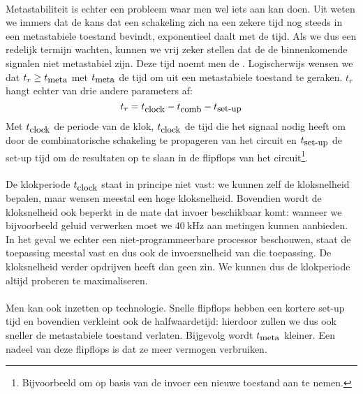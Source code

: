 \paragraph{}
Metastabiliteit is echter een probleem waar men wel iets aan kan doen. Uit  weten we immers dat de kans dat een schakeling zich na een zekere tijd nog steeds in een metastabiele toestand bevindt, exponentieel daalt met de tijd. Als we dus een redelijk termijn wachten, kunnen we vrij zeker stellen dat de de binnenkomende signalen niet metastabiel zijn. Deze tijd noemt men de . Logischerwijs wensen we dat $t_r\geq t_{\mbox{\small meta}}$ met $t_{\mbox{\small meta}}$ de tijd om uit een metastabiele toestand te geraken. $t_r$ hangt echter van drie andere parameters af:
\begin{equation}
t_r=t_{\mbox{\small clock}}-t_{\mbox{\small comb}}-t_{\mbox{\small set-up}}
\end{equation}
Met $t_{\mbox{\small clock}}$ de periode van de klok, $t_{\mbox{\small clock}}$ de tijd die het signaal nodig heeft om door de combinatorische schakeling te propageren van het circuit en $t_{\mbox{\small set-up}}$ de set-up tijd om de resultaten op te slaan in de flipflops van het circuit\footnote{Bijvoorbeeld om op basis van de invoer een nieuwe toestand aan te nemen.}.
\paragraph{}
De klokperiode $t_{\mbox{\small clock}}$ staat in principe niet vast: we kunnen zelf de kloksnelheid bepalen, maar wensen meestal een hoge kloksnelheid. Bovendien wordt de kloksnelheid ook beperkt in de mate dat invoer beschikbaar komt: wanneer we bijvoorbeeld geluid verwerken moet we $40~\mbox{kHz}$ aan metingen kunnen aanbieden. In het geval we echter een niet-programmeerbare processor beschouwen, staat de toepassing meestal vast en dus ook de invoersnelheid van die toepassing. De kloksnelheid verder opdrijven heeft dan geen zin. We kunnen dus de klokperiode altijd proberen te maximaliseren.
\paragraph{}
Men kan ook inzetten op technologie. Snelle flipflops hebben een kortere set-up tijd en bovendien verkleint ook de halfwaardetijd: hierdoor zullen we dus ook sneller de metastabiele toestand verlaten. Bijgevolg wordt $t_{\mbox{\small meta}}$ kleiner. Een nadeel van deze flipflops is dat ze meer vermogen verbruiken.
